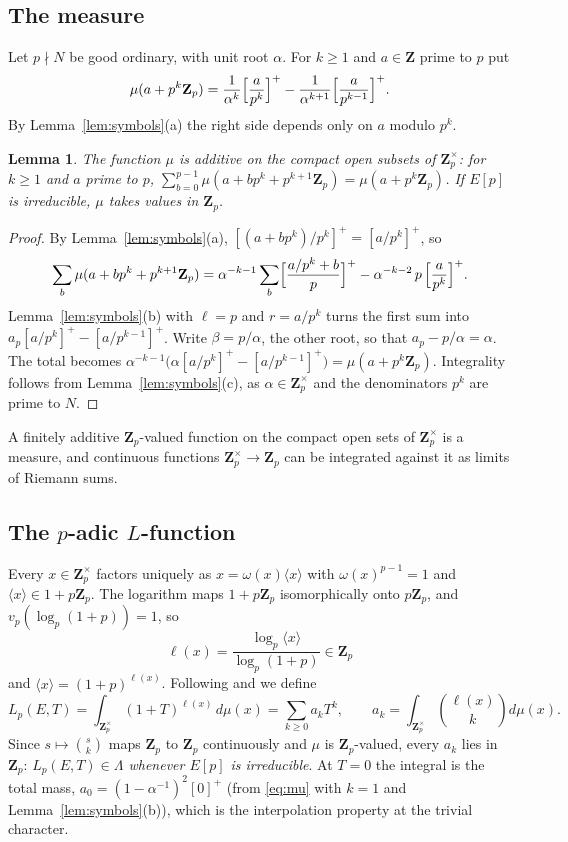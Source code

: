 \documentclass[11pt]{amsart}
\newtheorem{lemma}[theorem]{Lemma}
\theoremstyle{definition}
\newcommand{\Z}{\mathbf{Z}}
\newcommand{\Zp}{\mathbf{Z}_p}
\begin{document}
\subsection{The measure}
Let $p\nmid N$ be good ordinary, with unit root $\alpha$. For $k\ge1$ and $a\in\Z$ prime to $p$ put
\begin{equation}\label{eq:mu}
\mu(a+p^k\Zp)=\frac{1}{\alpha^{k}}\Bigl[\frac{a}{p^k}\Bigr]^+-\frac{1}{\alpha^{k+1}}\Bigl[\frac{a}{p^{k-1}}\Bigr]^+ .
\end{equation}
By Lemma~\ref{lem:symbols}(a) the right side depends only on $a$ modulo $p^k$.

\begin{lemma}\label{lem:distribution}
The function $\mu$ is additive on the compact open subsets of $\Zp^\times$: for $k\ge1$ and $a$ prime to $p$,
$\sum_{b=0}^{p-1}\mu(a+bp^k+p^{k+1}\Zp)=\mu(a+p^k\Zp)$.
If $E[p]$ is irreducible, $\mu$ takes values in $\Zp$.
\end{lemma}

\begin{proof}
By Lemma~\ref{lem:symbols}(a), $[(a+bp^k)/p^k]^+=[a/p^k]^+$, so
\[
\sum_{b}\mu(a+bp^k+p^{k+1}\Zp)=\alpha^{-k-1}\sum_{b}\Bigl[\frac{a/p^k+b}{p}\Bigr]^+-\alpha^{-k-2}\,p\,\Bigl[\frac{a}{p^k}\Bigr]^+ .
\]
Lemma~\ref{lem:symbols}(b) with $\ell=p$ and $r=a/p^k$ turns the first sum into $a_p[a/p^k]^+-[a/p^{k-1}]^+$. Write $\beta=p/\alpha$, the other root, so that $a_p-p/\alpha=\alpha$. The total becomes $\alpha^{-k-1}\bigl(\alpha[a/p^k]^+-[a/p^{k-1}]^+\bigr)=\mu(a+p^k\Zp)$. Integrality follows from Lemma~\ref{lem:symbols}(c), as $\alpha\in\Zp^\times$ and the denominators $p^k$ are prime to $N$.
\end{proof}

A finitely additive $\Zp$-valued function on the compact open sets of $\Zp^\times$ is a measure, and continuous functions $\Zp^\times\to\Zp$ can be integrated against it as limits of Riemann sums.

\subsection{The \texorpdfstring{$p$}{p}-adic \texorpdfstring{$L$}{L}-function}
Every $x\in\Zp^\times$ factors uniquely as $x=\omega(x)\langle x\rangle$ with $\omega(x)^{p-1}=1$ and $\langle x\rangle\in1+p\Zp$. The logarithm maps $1+p\Zp$ isomorphically onto $p\Zp$, and $v_p(\log_p(1+p))=1$, so
\[
\ell(x)=\frac{\log_p\langle x\rangle}{\log_p(1+p)}\in\Zp
\]
and $\langle x\rangle=(1+p)^{\ell(x)}$. Following \cite{MTT86} and \cite[\S3]{SW13} we define
\begin{equation}\label{eq:Lp}
L_p(E,T)=\int_{\Zp^\times}(1+T)^{\ell(x)}\,d\mu(x)=\sum_{k\ge0}a_kT^k,\qquad a_k=\int_{\Zp^\times}\binom{\ell(x)}{k}d\mu(x).
\end{equation}
Since $s\mapsto\binom{s}{k}$ maps $\Zp$ to $\Zp$ continuously and $\mu$ is $\Zp$-valued, every $a_k$ lies in $\Zp$: \emph{$L_p(E,T)\in\Lambda$ whenever $E[p]$ is irreducible}. At $T=0$ the integral is the total mass, $a_0=(1-\alpha^{-1})^2[0]^+$ (from \eqref{eq:mu} with $k=1$ and Lemma~\ref{lem:symbols}(b)), which is the interpolation property at the trivial character.
\end{document}
